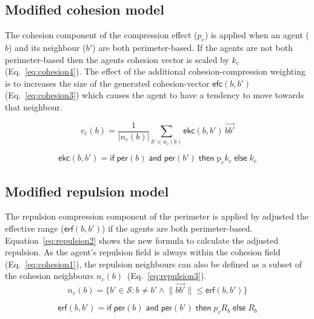 \documentclass[12pt,a4paper]{IEEEtran}
\begin{document}
\subsection{Modified cohesion model}
The cohesion component of the compression effect ($p_c$) is applied when an agent ($b$) and its neighbour ($b'$) are both perimeter-based. If the agents are not both perimeter-based then the agents cohesion vector is scaled by $k_c$ (Eq.~\ref{eq:cohesion4}). The effect of the additional cohesion-compression weighting is to increases the size of the generated cohesion-vector $\mathsf{efc}(b,b')$ (Eq.~\ref{eq:cohesion3}) which causes the agent to have a tendency to move towards that neighbour. 

\begin{equation}\label{eq:cohesion3}
v_c(b) = \frac{1}{\lvert n_c(b)\rvert} \sum_{b' \in n_c(b)}\mathsf{ekc}(b, b')\, \vec{b b'}
\end{equation}

\small
\begin{equation}\label{eq:cohesion4}
\mathsf{ekc}(b, b') = \mathsf{if} \; \mathsf{per}(b) \; \mathsf{and} \; \mathsf{per}(b') \; \mathsf{then} \; \mathrm{p}_ck_c \; \mathsf{else} \; k_c
\end{equation}
\normalsize

\subsection{Modified repulsion model}\label{repulsion:compression}
The repulsion compression component of the perimeter is applied by adjusted the effective range ($\mathsf{erf}(b,b')$) if the agents are both perimeter-based. Equation~\ref{eq:repulsion2} shows the new formula to calculate the adjusted repulsion. As the agent's repulsion field is always within the cohesion field (Eq.~\ref{eq:cohesion1}), the repulsion neighbours can also be defined as a subset of the cohesion neighbours $n_c(b)$~(Eq.~\ref{eq:repulsion3}).\\

\begin{equation}\label{eq:repulsion1}
n_r(b) = \{b' \in \mathcal{S} : b \neq b' \land \lVert\vec{b b'}\rVert \leq \mathsf{erf}(b,b')\}
\end{equation}

\small
\begin{equation}\label{eq:repulsion2}
\mathsf{erf}(b, b') = \mathsf{if} \;
\mathsf{per}(b) \; \mathsf{and} \; \mathsf{per}(b') \; \mathsf{then} \;
p_rR_b \; \mathsf{else} \; R_b
\end{equation}
\normalsize
\end{document}
